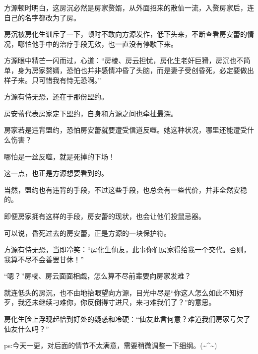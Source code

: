 \begin{this_body}
方源顿时明白，这房沉必然是房家赘婿，从外面招来的散仙一流，入赘房家后，连自己的名字都改为了房。

房沉被房化生训斥了一下，顿时不敢向方源发作，低下头来，不断查看房安蕾的情况，哪怕他手中的治疗手段无效，也一直没有停歇下来。

方源眼中精芒一闪而过，心道：“房棱、房云担忧，房化生老奸巨猾，房沉也不简单，身为房家赘婿，恐怕也并非感情冲昏了头脑，而是妻子受创昏死，必定要做出样子来。只可惜我有恃无恐啊。”

方源有恃无恐，还在于那份盟约。

房安蕾代表房家定下盟约，自身和方源之间也牵扯最深。

房家若是违背盟约，恐怕房安蕾就要遭受信道反噬。她这种状况，哪里还能遭受什么伤害？

哪怕是一丝反噬，就是死掉的下场！

这一点，也正是方源想要看到的。

当然，盟约也有违背的手段，不过这些手段，也总会有一些代价，并非全然安稳的。

即便房家拥有这样的手段，房安蕾的现状，也会让他们投鼠忌器。

可以说，昏死过去的房安蕾，正是方源的一块保护符。

方源有恃无恐，当即冷笑：“房化生仙友，此事你们房家得给我一个交代。否则，我算不尽不会善罢甘休！”

“嗯？”房棱、房云面面相觑，怎么算不尽前辈要向房家发难？

就连低头的房沉，也不由地抬眼望向方源，目光中尽是“你这人怎么如此不知好歹，我还未继续刁难你，你反倒得寸进尺，来刁难我们了？”的意思。

房化生脸上浮现起恰到好处的疑惑和冷硬：“仙友此言何意？难道我们房家亏欠了仙友什么吗？”

ps:今天一更，对后面的情节不太满意，需要稍微调整一下细纲。(\~{}\^{}\~{})

\end{this_body}

